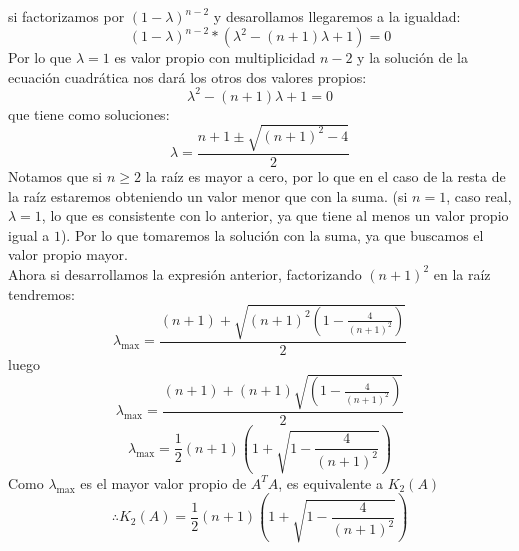 \documentclass{article}
\begin{document}
si factorizamos por $(1-\lambda)^{n-2}$ y desarollamos llegaremos a la igualdad:
$$(1-\lambda)^{n-2}*(\lambda^{2}-(n+1)\lambda +1)=0$$
Por lo que $\lambda =1 $ es valor propio con multiplicidad $n-2$ y la solución de la ecuación cuadrática nos dará los otros dos valores propios:
$$\lambda^{2}-(n+1)\lambda +1=0$$
que tiene como soluciones:
$$\lambda = \frac{n+1\pm\sqrt{(n+1)^{2}-4}}{2}$$
Notamos que si $n\ge 2$ la raíz es mayor a cero, por lo que en el caso de la resta de la raíz estaremos obteniendo un valor menor que con la suma. (si $n=1$, caso real, $\lambda = 1$, lo que es consistente con lo anterior, ya que tiene al menos un valor propio igual a $1$). Por lo que tomaremos la solución con la suma, ya que buscamos el valor propio mayor.\\
Ahora si desarrollamos la expresión anterior, factorizando $(n+1)^{2}$ en la raíz tendremos:
$$\lambda_{\max} = \frac{(n+1)+\sqrt{(n+1)^{2}\left(1-\frac{4}{(n+1)^{2}}\right)}}{2}$$
luego
$$\lambda_{\max} = \frac{(n+1)+(n+1)\sqrt{\left(1-\frac{4}{(n+1)^{2}}\right)}}{2}$$
$$\lambda_{\max} = \frac{1}{2}(n+1)\left(1+\sqrt{1-\frac{4}{(n+1)^{2}}}\right)$$
Como $\lambda_{\max}$  es el mayor valor propio de $A^{T}A$, es equivalente a $K_2(A)$
$$\therefore K_2(A) = \frac{1}{2}(n+1)\left(1+\sqrt{1-\frac{4}{(n+1)^{2}}}\right)$$
\end{document}
